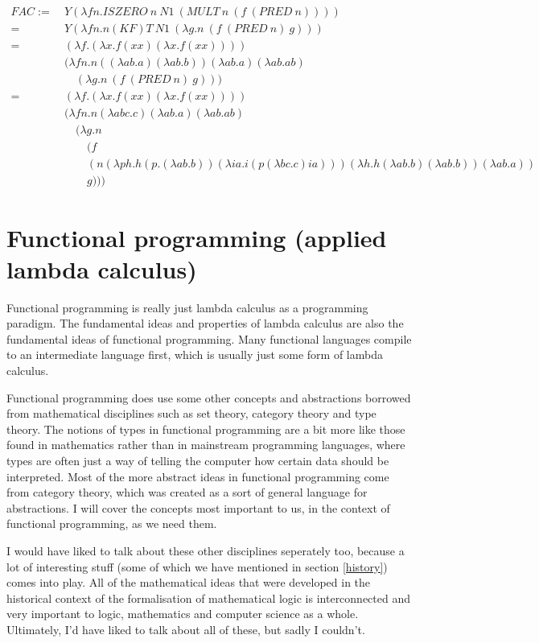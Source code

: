 \documentclass[11pt]{article}
\begin{document}
\begin{align*}
	FAC :=\ &Y(\lambda fn.ISZERO\ n\ N1\ (MULT\ n\ (f\ (PRED\ n))))\\
	=\ &Y(\lambda fn.n(KF)T\ N1\ (\lambda g.n\ (f\ (PRED\ n)\ g)))\\
	=\ &(\lambda f.(\lambda x.f(xx)(\lambda x.f(xx))))\\
	&(\lambda fn.n((\lambda ab.a)(\lambda ab.b))(\lambda ab.a)(\lambda ab.ab)\\
	&\quad(\lambda g.n\ (f\ (PRED\ n)\ g)))\\
	=\ &(\lambda f.(\lambda x.f(xx)(\lambda x.f(xx))))\\
	&(\lambda fn.n(\lambda abc.c)(\lambda ab.a)(\lambda ab.ab)\\
	&\quad(\lambda g.n\\
	&\quad\quad(f\\
	&\quad\quad(n(\lambda ph.h(p.(\lambda ab.b))(\lambda ia.i(p(\lambda bc.c)ia)))(\lambda h.h(\lambda ab.b)(\lambda ab.b))(\lambda ab.a))\\
	&\quad\quad g)))
\end{align*}

\section{Functional programming (applied lambda calculus)}

Functional programming is really just lambda calculus as a programming
paradigm. The fundamental ideas and properties of lambda calculus are also the
fundamental ideas of functional programming. Many functional languages compile
to an intermediate language first, which is usually just some form of lambda
calculus.

Functional programming does use some other concepts and abstractions borrowed
from mathematical disciplines such as set theory, category theory and type
theory. The notions of types in functional programming are a bit more like
those found in mathematics rather than in mainstream programming languages,
where types are often just a way of telling the computer how certain data
should be interpreted. Most of the more abstract ideas in functional
programming come from category theory, which was created as a sort of general
language for abstractions. I will cover the concepts most important to us, in
the context of functional programming, as we need them.

I would have liked to talk about these other disciplines seperately too,
because a lot of interesting stuff (some of which we have mentioned in section
\ref{history}) comes into play. All of the mathematical ideas that were
developed in the historical context of the formalisation of mathematical logic
is interconnected and very important to logic, mathematics and computer science
as a whole. Ultimately, I'd have liked to talk about all of these, but sadly I
couldn't.
\end{document}
